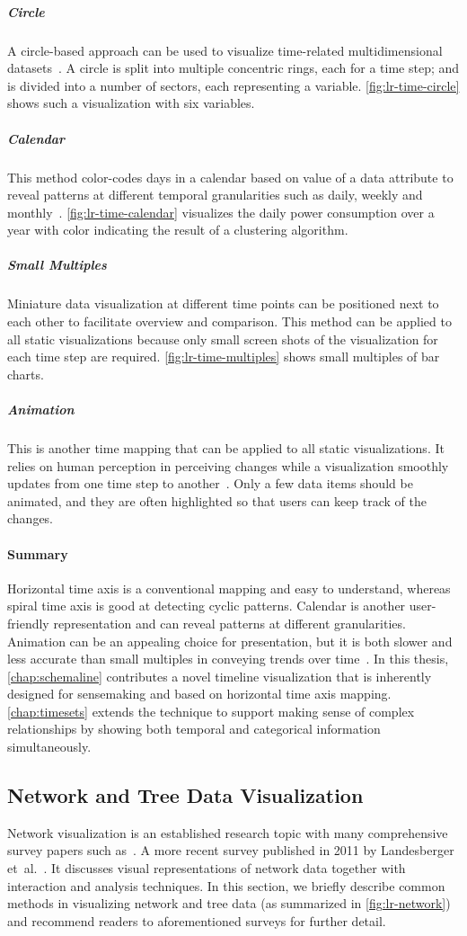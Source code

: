 \subparagraph{Circle} A circle-based approach can be used to visualize time-related multidimensional datasets~\cite{Keim2004}. A circle is split into multiple concentric rings, each for a time step; and is divided into a number of sectors, each representing a variable. \autoref{fig:lr-time-circle} shows such a visualization with six variables.

\subparagraph{Calendar} This method color-codes days in a calendar based on value of a data attribute to reveal patterns at different temporal granularities such as daily, weekly and monthly~\cite{VanWijk1999}. \autoref{fig:lr-time-calendar} visualizes the daily power consumption over a year with color indicating the result of a clustering algorithm.

\subparagraph{Small Multiples}  Miniature data visualization at different time points can be positioned next to each other to facilitate overview and comparison. This method can be applied to all static visualizations because only small screen shots of the visualization for each time step are required. \autoref{fig:lr-time-multiples} shows small multiples of bar charts.

\subparagraph{Animation} This is another time mapping that can be applied to all static visualizations. It relies on human perception in perceiving changes while a visualization smoothly updates from one time step to another~\cite{Gapminder}. Only a few data items should be animated, and they are often highlighted so that users can keep track of the changes.

\paragraph{Summary} Horizontal time axis is a conventional mapping and easy to understand, whereas spiral time axis is good at detecting cyclic patterns. Calendar is another user-friendly representation and can reveal patterns at different granularities. Animation can be an appealing choice for presentation, but it is both slower and less accurate than small multiples in conveying trends over time~\cite{Robertson2008}. In this thesis, \autoref{chap:schemaline} contributes a novel timeline visualization that is inherently designed for sensemaking and based on horizontal time axis mapping. \autoref{chap:timesets} extends the technique to support making sense of complex relationships by showing both temporal and categorical information simultaneously.

\subsection{Network and Tree Data Visualization}
Network visualization is an established research topic with many comprehensive survey papers such as~\cite{Herman2000}. A more recent survey published in 2011 by Landesberger et~al.~\cite{Landesberger2011}. It discusses visual representations of network data together with interaction and analysis techniques. In this section, we briefly describe common methods in visualizing network and tree data (as summarized in \autoref{fig:lr-network}) and recommend readers to aforementioned surveys for further detail.


